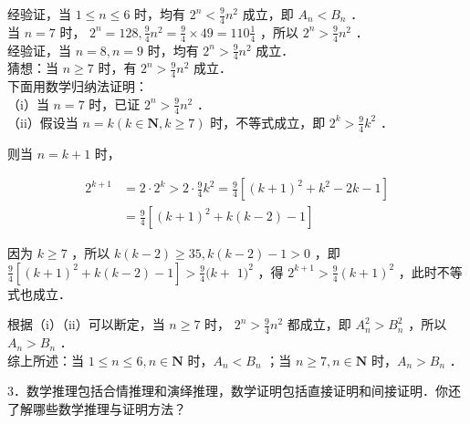 \documentclass[10pt]{article}
\begin{document}
经验证，当 \(1 \leqslant n \leqslant 6\) 时，均有 \(2^{n}<\frac{9}{4} n^{2}\) 成立，即 \(A_{n}<B_{n}\) ．\\
当 \(n=7\) 时， \(2^{n}=128, \frac{9}{4} n^{2}=\frac{9}{4} \times 49=110 \frac{1}{4}\) ，所以 \(2^{n}>\frac{9}{4} n^{2}\) ．\\
经验证，当 \(n=8, n=9\) 时，均有 \(2^{n}>\frac{9}{4} n^{2}\) 成立．\\
猜想：当 \(n \geqslant 7\) 时，有 \(2^{n}>\frac{9}{4} n^{2}\) 成立．\\
下面用数学归纳法证明：\\
（i）当 \(n=7\) 时，已证 \(2^{n}>\frac{9}{4} n^{2}\) ．\\
（ii）假设当 \(n=k(k \in \mathbf{N}, k \geqslant 7)\) 时，不等式成立，即 \(2^{k}>\frac{9}{4} k^{2}\) ．

则当 \(n=k+1\) 时，

\[
\begin{aligned}
2^{k+1} & =2 \cdot 2^{k}>2 \cdot \frac{9}{4} k^{2}=\frac{9}{4}\left[(k+1)^{2}+k^{2}-2 k-1\right] \\
& =\frac{9}{4}\left[(k+1)^{2}+k(k-2)-1\right]
\end{aligned}
\]

因为 \(k \geqslant 7\) ，所以 \(k(k-2) \geqslant 35, k(k-2)-1>0\) ，即 \(\frac{9}{4}\left[(k+1)^{2}+k(k-2)-1\right]>\frac{9}{4}(k+\) \(1)^{2}\) ，得 \(2^{k+1}>\frac{9}{4}(k+1)^{2}\) ，此时不等式也成立．

根据（i）（ii）可以断定，当 \(n \geqslant 7\) 时， \(2^{n}>\frac{9}{4} n^{2}\) 都成立，即 \(A_{n}^{2}>B_{n}^{2}\) ，所以 \(A_{n}>B_{n}\) ．\\
综上所述：当 \(1 \leqslant n \leqslant 6, n \in \mathbf{N}\) 时，\(A_{n}<B_{n}\) ；当 \(n \geqslant 7, n \in \mathbf{N}\) 时，\(A_{n}>B_{n}\) ．

3．数学推理包括合情推理和演绎推理，数学证明包括直接证明和间接证明．你还了解哪些数学推理与证明方法？
\end{document}
